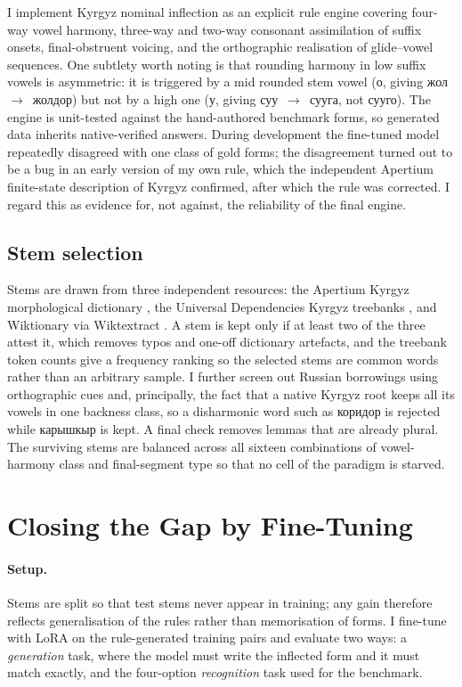 \documentclass[11pt]{article}
\newcommand{\ky}[1]{\foreignlanguage{russian}{#1}}
\begin{document}
I implement Kyrgyz nominal inflection as an explicit rule engine covering four-way
vowel harmony, three-way and two-way consonant assimilation of suffix onsets,
final-obstruent voicing, and the orthographic realisation of glide--vowel sequences.
One subtlety worth noting is that rounding harmony in low suffix vowels is asymmetric:
it is triggered by a mid rounded stem vowel (\ky{о}, giving \ky{жол}~$\to$~\ky{жолдор})
but not by a high one (\ky{у}, giving \ky{суу}~$\to$~\ky{сууга}, not \ky{сууго}). The
engine is unit-tested against the hand-authored benchmark forms, so generated data
inherits native-verified answers. During development the fine-tuned model repeatedly
disagreed with one class of gold forms; the disagreement turned out to be a bug in an
early version of my own rule, which the independent Apertium finite-state description
of Kyrgyz \cite{khanna2021apertium} confirmed, after which the rule was corrected. I
regard this as evidence for, not against, the reliability of the final engine.

\subsection{Stem selection}

Stems are drawn from three independent resources: the Apertium Kyrgyz morphological
dictionary \cite{khanna2021apertium}, the Universal Dependencies Kyrgyz treebanks
\cite{nivre2020ud}, and Wiktionary via Wiktextract \cite{ylonen2022wiktextract}. A
stem is kept only if at least two of the three attest it, which removes typos and one-off
dictionary artefacts, and the treebank token counts give a frequency ranking so the
selected stems are common words rather than an arbitrary sample. I further screen out
Russian borrowings using orthographic cues and, principally, the fact that a native
Kyrgyz root keeps all its vowels in one backness class, so a disharmonic word such as
\ky{коридор} is rejected while \ky{карышкыр} is kept. A final check removes lemmas that
are already plural. The surviving stems are balanced across all sixteen combinations of
vowel-harmony class and final-segment type so that no cell of the paradigm is starved.

\section{Closing the Gap by Fine-Tuning}
\label{sec:finetune}

\paragraph{Setup.} Stems are split so that test stems never appear in training; any
gain therefore reflects generalisation of the rules rather than memorisation of forms.
I fine-tune with LoRA \cite{hu2022lora} on the rule-generated training pairs and
evaluate two ways: a
\emph{generation} task, where the model must write the inflected form and it must match
exactly, and the four-option \emph{recognition} task used for the benchmark.
\end{document}
